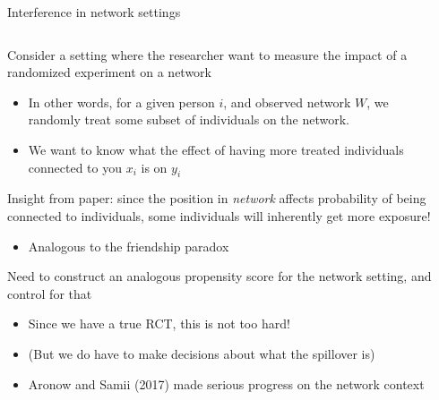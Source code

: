 \documentclass[notes,11pt, aspectratio=169]{beamer}
\newenvironment{wideitemize}{\itemize\addtolength{\itemsep}{10pt}}{\enditemize}
\begin{document}
\begin{frame}{ Interference in network settings }
\begin{columns}[T] %
\begin{column}{.9\textwidth}
  \begin{wideitemize}
  \item Consider a setting where the researcher want to measure the impact of a
    randomized experiment on a network
    \begin{itemize}
    \item In other words, for a given person $i$, and observed network $W$, we randomly treat some subset of individuals on the network.
    \item We want to know what the effect of having more treated
      individuals connected to you $x_{i}$ is on $y_{i}$
    \end{itemize}
  \item Insight from paper: since the position in \emph{network} affects probability of being connected to individuals, some individuals will inherently get more exposure!
    \begin{itemize}
    \item Analogous to the friendship paradox
    \end{itemize}
  \item Need to construct an analogous propensity score for the
    network setting, and control for that
    \begin{itemize}
    \item Since we have a true RCT, this is not too hard!
    \item (But we do have to make decisions about what the spillover is)
    \item Aronow and Samii (2017) made serious progress on the network
      context
    \end{itemize}
  \end{wideitemize}
\end{column}%
\hfill%
\begin{column}{.45\textwidth}
\end{column}%
\end{columns}
\end{frame}
\end{document}
